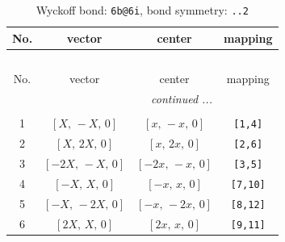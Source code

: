 \documentclass[fleqn,8pt]{jsarticle}
\begin{document}
\begin{longtable}{cccc}
\caption{Wyckoff bond: {\tt 6b@6i}, bond symmetry: {\tt ..2}}
 \\
 \hline \hline
No. & vector & center & mapping \\ \hline \endfirsthead

\multicolumn{3}{l}{\tablename\ \thetable{}} \\
 \hline \hline
No. & vector & center & mapping \\ \hline \endhead

 \hline \hline
\multicolumn{3}{r}{\footnotesize\it continued ...} \\ \endfoot

 \hline \hline
\multicolumn{3}{r}{} \\ \endlastfoot

1 & $\left[ X,\, - X,\, 0 \right]$ & $\left[ x,\, - x,\, 0 \right]$ & {\tt [1,4]} \\ \hline
2 & $\left[ X,\, 2 X,\, 0 \right]$ & $\left[ x,\, 2 x,\, 0 \right]$ & {\tt [2,6]} \\ \hline
3 & $\left[ - 2 X,\, - X,\, 0 \right]$ & $\left[ - 2 x,\, - x,\, 0 \right]$ & {\tt [3,5]} \\ \hline
4 & $\left[ - X,\, X,\, 0 \right]$ & $\left[ - x,\, x,\, 0 \right]$ & {\tt [7,10]} \\ \hline
5 & $\left[ - X,\, - 2 X,\, 0 \right]$ & $\left[ - x,\, - 2 x,\, 0 \right]$ & {\tt [8,12]} \\ \hline
6 & $\left[ 2 X,\, X,\, 0 \right]$ & $\left[ 2 x,\, x,\, 0 \right]$ & {\tt [9,11]} \\
\end{longtable}
\renewcommand{\arraystretch}{1.2}
\end{document}
